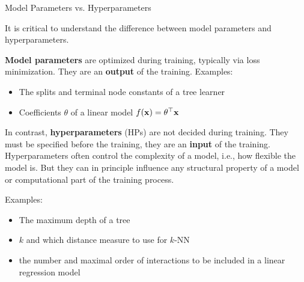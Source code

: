 
\begin{frame}{Model Parameters vs. Hyperparameters}

It is critical to understand the difference between model parameters and hyperparameters.

\vspace{0.5cm}

\textbf{Model parameters} are optimized during training, typically via loss minimization. They are an \textbf{output} of the training. Examples:
\begin{itemize}
\item The splits and terminal node constants of a tree learner
\item Coefficients $\theta$ of a linear model $f(\mathbf{x}) = \theta^\top\mathbf{x}$
\end{itemize}

\framebreak

In contrast, \textbf{hyperparameters} (HPs) are not decided during training. They must be specified before the training, they are an \textbf{input} of the training.
Hyperparameters often control the complexity of a model, i.e., how flexible the model is.
But they can in principle influence any structural property of a model or computational part of the training process.

\vspace{0.5cm}

Examples:

\begin{itemize}
\item The maximum depth of a tree
\item $k$ and which distance measure to use for $k$-NN
\item the number and maximal order of interactions to be included in a linear regression model
\end{itemize}

\end{frame}


